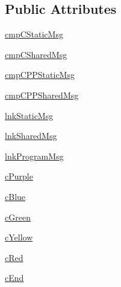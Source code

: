 \subsection*{Public Attributes}
\begin{DoxyCompactItemize}
\item 
\hyperlink{classcolorizer_1_1colorizer_ac24351a64976018317ab1ac358d797f7}{cmp\-C\-Static\-Msg}
\item 
\hyperlink{classcolorizer_1_1colorizer_a0c814bf7c63fed9a8a96939eb8c1d1ab}{cmp\-C\-Shared\-Msg}
\item 
\hyperlink{classcolorizer_1_1colorizer_a91d0fcfdb4e7bbf040c0532b4570b8c7}{cmp\-C\-P\-P\-Static\-Msg}
\item 
\hyperlink{classcolorizer_1_1colorizer_a4dc6f2274fbe6484646f68f3dab78c0f}{cmp\-C\-P\-P\-Shared\-Msg}
\item 
\hyperlink{classcolorizer_1_1colorizer_a7de7f95380dcbbdaf401badbf25cd0a5}{lnk\-Static\-Msg}
\item 
\hyperlink{classcolorizer_1_1colorizer_a9d7966ab858bb4de680f87bc0b5136d0}{lnk\-Shared\-Msg}
\item 
\hyperlink{classcolorizer_1_1colorizer_a33cdf718ddc7818b92520209a6aba1c3}{lnk\-Program\-Msg}
\item 
\hyperlink{classcolorizer_1_1colorizer_a77c11dd1f944f7326ff0d4fa5e848615}{c\-Purple}
\item 
\hyperlink{classcolorizer_1_1colorizer_afb3311984592a09972a06c13535a55ee}{c\-Blue}
\item 
\hyperlink{classcolorizer_1_1colorizer_a6ddc3dedd2960fa8d0c5082e16548a6c}{c\-Green}
\item 
\hyperlink{classcolorizer_1_1colorizer_a06ba96b52cd7d1ffd40d985499aa1974}{c\-Yellow}
\item 
\hyperlink{classcolorizer_1_1colorizer_a8d53c608c27c2a67595e9dae02c6eea9}{c\-Red}
\item 
\hyperlink{classcolorizer_1_1colorizer_a1756bc6b84894e8ba4689d5137574def}{c\-End}
\end{DoxyCompactItemize}
